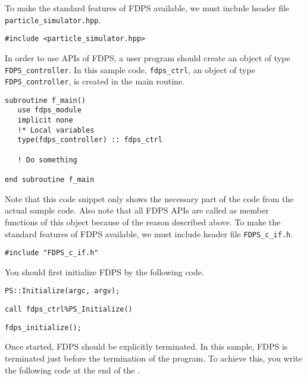 \ifCpp %
To make the standard features of FDPS available, we must include header file  \texttt{particle\_simulator.hpp}.
\begin{lstlisting}[caption=Including header file \texttt{particle\_simulator.hpp}]
#include <particle_simulator.hpp>
\end{lstlisting}
\endifCpp
\ifFtn %
In order to use APIs of FDPS, a user program should create an object of
type \texttt{FDPS\_controller}. In this sample code, \texttt{fdps\_ctrl}, an object of type \texttt{FDPS\_controller}, is created in the main routine.
\begin{lstlisting}[caption=Creation of an object of type \texttt{fdps\_controller}]
subroutine f_main()
   use fdps_module
   implicit none
   !* Local variables
   type(fdps_controller) :: fdps_ctrl
    
   ! Do something
   
end subroutine f_main    
\end{lstlisting}
Note that this code snippet only shows the necessary part of the code from the actual sample code. Also note that all FDPS APIs are called as member functions of this object because of the reason described above.
\endifFtn
\ifC %
To make the standard features of FDPS available, we must include header file  \texttt{FDPS\_c\_if.h}.
\begin{lstlisting}[caption=Including header file \texttt{FDPS\_c\_if.h}]
#include "FDPS_c_if.h"
\end{lstlisting}
\endifC

You should first initialize FDPS by the following code.
\ifCpp %
\begin{lstlisting}[caption=Initialization of FDPS]
PS::Initialize(argc, argv);
\end{lstlisting}
\endifCpp
\ifFtn %
\begin{lstlisting}[caption=Initialization of FDPS]
call fdps_ctrl%PS_Initialize()
\end{lstlisting}
\endifFtn
\ifC %
\begin{lstlisting}[caption=Initialization of FDPS]
fdps_initialize();
\end{lstlisting}
\endifC

Once started, FDPS should be explicitly terminated. In this sample, FDPS is terminated just before the termination of the program. To achieve this, you write the following code at the end of the \mainFunc.

